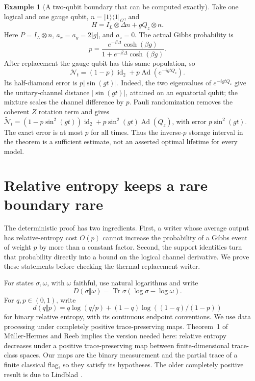 \documentclass[11pt,reqno]{amsart}
\numberwithin{equation}{section}
\theoremstyle{definition}
\newtheorem{example}[theorem]{Example}
\theoremstyle{remark}
\newcommand{\Tr}{\operatorname{Tr}}
\newcommand{\id}{\operatorname{id}}
\newcommand{\Ad}{\operatorname{Ad}}
\newcommand{\Ncal}{\mathcal N}
\begin{document}
\begin{example}[A two-qubit boundary that can be computed exactly]
\label{ex:two-qubit}
Take one logical and one gauge qubit, \(n=|1\rangle\langle1|_G\), and
\[
              H=I_L\otimes\Delta n+gQ_z\otimes n.
\]
Here \(P=I_L\otimes n\), \(a_x=a_y=2|g|\), and \(a_z=0\).
The actual Gibbs probability is
\[
       p=\frac{e^{-\beta\Delta}\cosh(\beta g)}
                  {1+e^{-\beta\Delta}\cosh(\beta g)}.
\]
After replacement the gauge qubit has this same population, so
\[
 \Ncal_t=(1-p)\id_2+p\Ad(e^{-igtQ_z}).
\]
Its half-diamond error is \(p|\sin(gt)|\). Indeed, the two eigenvalues
of \(e^{-igtQ_z}\) give the unitary-channel distance
\(|\sin(gt)|\), attained on an equatorial qubit; the mixture scales
the channel difference by \(p\). Pauli randomization removes the
coherent \(Z\) rotation term and gives
\(\widetilde{\Ncal}_t=(1-p\sin^2(gt))\id_2+
p\sin^2(gt)\Ad(Q_z)\), with error \(p\sin^2(gt)\).
The exact error is at most \(p\) for all times. Thus the
inverse-\(p\) storage interval in the theorem is a sufficient estimate,
not an asserted optimal lifetime for every model.
\end{example}

\section{Relative entropy keeps a rare boundary rare}\label{sec:entropy}

The deterministic proof has two ingredients. First, a writer whose average
output has relative-entropy cost \(O(p)\) cannot increase the probability of
a Gibbs event of weight \(p\) by more than a constant factor. Second, the
support identities turn that probability directly into a bound on the
logical channel derivative. We prove these statements before checking the
thermal replacement writer.

For states \(\sigma,\omega\), with \(\omega\) faithful, use natural logarithms
and write
\[
 D(\sigma\Vert\omega)=\Tr\sigma(\log\sigma-\log\omega).
\]
For \(q,p\in(0,1)\), write
\[
 d(q\Vert p)=q\log(q/p)+(1-q)\log((1-q)/(1-p))
\]
for binary relative entropy, with its continuous endpoint conventions.
We use data processing under completely positive trace-preserving maps.
Theorem~1 of M\"uller-Hermes and Reeb \cite{MHR17} implies the version needed
here: relative entropy decreases under a positive trace-preserving map
between finite-dimensional trace-class spaces. Our maps are the binary
measurement and the partial trace of a finite classical flag, so they
satisfy its hypotheses. The older completely positive result is due to
Lindblad \cite{Lindblad75}.
\end{document}
